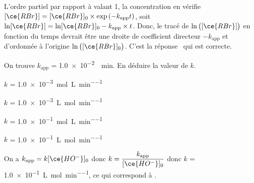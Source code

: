 \reponse{\reponseB{}}

\begin{corrige}
L'ordre partiel par rapport à  valant 1, la concentration en  vérifie $[\ce{RBr}] = [\ce{RBr}]_0 \times \exp\left(-k_\text{app}t\right)$, soit $\ln [\ce{RBr}] = \ln [\ce{RBr}]_0 - k_\text{app}\times t$. Donc, le tracé de 
$\ln \big([\ce{RBr}]\big)$ en fonction du temps devrait être une droite de coefficient directeur $-k_\text{app}$ et d'ordonnée à l'origine $\ln \big([\ce{RBr}]_0\big)$. C'est la réponse~\reponseB{} qui est correcte.
\end{corrige}





\begin{enonce}
On trouve $k_\text{app}$ = \SI{1,0e-2}{\per\minute}. 
En déduire la valeur de $k$.

	\begin{listeQCM2Colonnes}
	\item $k$ = \SI{1,0e-3}{\mol\per\liter\per\minute}
	\item $k$ = \SI{1,0e-3}{\liter\per\mol\per\minute}	
	\item $k$ = \SI{1,0e-1}{\mol\per\liter\per\minute}
	\item $k$ = \SI{1,0e-1}{\liter\per\mol\per\minute}\\
	\end{listeQCM2Colonnes}

\end{enonce}

\reponse{\reponseD{}}

\begin{corrige}
On a  $k_\text{app} = k[\ce{HO^-}]_0$ donc $k = \dfrac{k_\text{app}}{[\ce{HO^-}]_0}$ donc $k$ = \SI{1,0e-1}{\liter\per\mol\per\minute}, ce qui correspond à \reponseD{}.
\end{corrige}


\finEntrainement



\newpage



